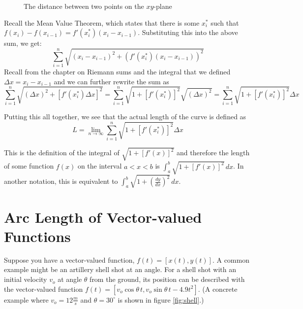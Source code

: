 \begin{figure}[H]
\centering
    \caption{The distance between two points on the $xy$-plane}
    \label{fig:distance}
\end{figure}

Recall the Mean Value Theorem, which states that there is some 
$x_i^{\text{*}}$ such that $f(x_i) - f(x_{i-1}) = f'(x_i^{\text{*}})
(x_i - x_{i-1})$. Substituting this into the above sum, we get: 
$$\sum_{i=1}^n \sqrt{(x_i - x_{i-1})^2 + (f'(x_i^{\text{*}})(x_i - x_{i-1}))^2}$$ 
Recall from the chapter on Riemann sums and the integral that we 
defined $\Delta x = x_i - x_{i-1}$ and we can further rewrite the 
sum as $$\sum_{i=1}^n \sqrt{(\Delta x)^2 + [f'(x_i^{\text{*}}) \Delta x]^2} 
= \sum_{i=1}^n \sqrt{1+[f'(x_i^{\text{*}})]^2}\sqrt{(\Delta x)^2} = 
\sum_{i=1}^n \sqrt{1+[f'(x_i^{\text{*}})]^2}\Delta x$$

Putting this all together, we see that the actual length of the 
curve is defined as $$L = \lim_{n \to \infty}\sum_{i=1}^n \sqrt{1+
[f'(x_i^{\text{*}})]^2}\Delta x$$

This is the definition of the integral of $\sqrt{1+[f'(x)]^2}$ and 
therefore the length of some function $f(x)$ on the interval $a < x <b$ 
is $\int_a^b \sqrt{1 + [f'(x)]^2}\,dx$. In another notation, this is 
equivalent to $\int_a^b \sqrt{1 + (\frac{dy}{dx})^2}\,dx$. 

\section{Arc Length of Vector-valued Functions}
Suppose you have a vector-valued function, $f(t) = [x(t), y(t)]$. A 
common example might be an artillery shell shot at an angle. For a 
shell shot with an initial velocity $v_o$ at angle $\theta$ from the 
ground, its position can be described with the vector-valued function 
$f(t) = [v_o\cos{\theta}\,t, v_o\sin{\theta}\,t - 4.9t^2]$. (A 
concrete example where $v_o = 12 \frac{m}{s}$ and $\theta = 30^\circ$ is 
shown in figure \ref{fig:shell}.)

